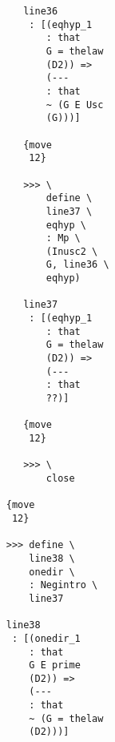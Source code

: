 \documentclass[12pt]{article}
\begin{document}
\begin{verbatim}
                                       line36 
                                        : [(eqhyp_1 
                                           : that 
                                           G = thelaw 
                                           (D2)) => 
                                           (--- 
                                           : that 
                                           ~ (G E Usc 
                                           (G)))]

                                       {move 
                                        12}

                                       >>> \
                                           define \
                                           line37 \
                                           eqhyp \
                                           : Mp \
                                           (Inusc2 \
                                           G, line36 \
                                           eqhyp)

                                       line37 
                                        : [(eqhyp_1 
                                           : that 
                                           G = thelaw 
                                           (D2)) => 
                                           (--- 
                                           : that 
                                           ??)]

                                       {move 
                                        12}

                                       >>> \
                                           close

                                    {move 
                                     12}

                                    >>> define \
                                        line38 \
                                        onedir \
                                        : Negintro \
                                        line37

                                    line38 
                                     : [(onedir_1 
                                        : that 
                                        G E prime 
                                        (D2)) => 
                                        (--- 
                                        : that 
                                        ~ (G = thelaw 
                                        (D2)))]


\end{verbatim}
\end{document}
